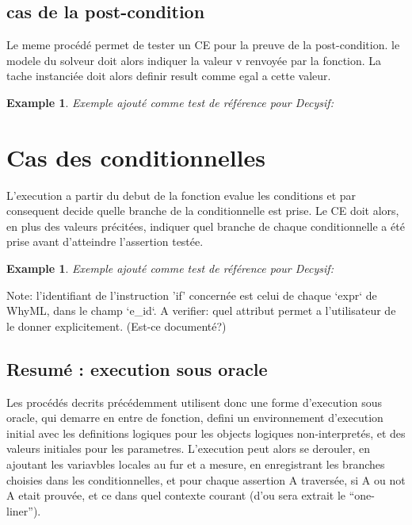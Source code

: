 \documentclass[a4paper,twoside]{article}
\newtheorem{example}[definition]{Example}
\begin{document}
\subsection{cas de la post-condition}

Le meme procédé permet de tester un CE pour la preuve de la post-condition. le
modele du solveur doit alors indiquer la valeur v renvoyée par la fonction. La
tache instanciée doit alors definir result comme egal a cette valeur.

\begin{example}
Exemple ajouté comme test de référence pour Decysif:


\end{example}


\section{Cas des conditionnelles}

L'execution a partir du debut de la fonction evalue les conditions et par
consequent decide quelle branche de la conditionnelle est prise. Le CE doit
alors, en plus des valeurs précitées, indiquer quel branche de chaque
conditionnelle a été prise avant d'atteindre l'assertion testée.

\begin{example}
Exemple ajouté comme test de référence pour Decysif:


\end{example}


Note: l'identifiant de l'instruction 'if' concernée est celui de chaque `expr`
de WhyML, dans le champ `e\_id`. A verifier: quel attribut permet a l'utilisateur
de le donner explicitement. (Est-ce documenté?)

\subsection{Resumé : execution sous oracle}

Les procédés decrits précédemment utilisent donc une forme d'execution sous oracle,
qui demarre en entre de fonction, defini un environnement d'execution initial
avec les definitions logiques pour les objects logiques non-interpretés, et des
valeurs initiales pour les parametres. L'execution peut alors se derouler, en
ajoutant les variavbles locales au fur et a mesure, en enregistrant les branches
choisies dans les conditionnelles, et pour chaque assertion A traversée, si A ou
not A etait prouvée, et ce dans quel contexte courant (d'ou sera extrait le
``one-liner'').
\end{document}
